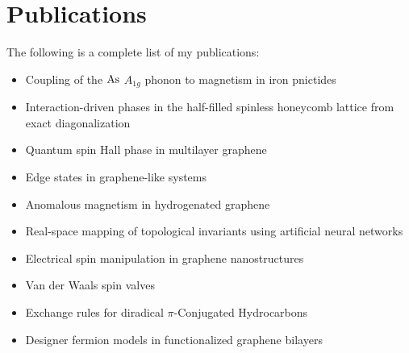 \chapter{Publications}
The following is a complete list of my publications:

\begin{itemize}
   \item Coupling of the $\ce{As}$ $A_{1g}$ phonon to magnetism in iron pnictides

   \item Interaction-driven phases in the half-filled spinless honeycomb lattice from exact diagonalization

   \item Quantum spin Hall phase in multilayer graphene
   \item Edge states in graphene-like systems

   \item Anomalous magnetism in hydrogenated graphene

   \item Real-space mapping of topological invariants using artificial neural networks

   \item Electrical spin manipulation in graphene nanostructures

   \item Van der Waals spin valves

   \item Exchange rules for diradical $\pi$-Conjugated Hydrocarbons

   \item Designer fermion models in functionalized graphene bilayers
\end{itemize}
